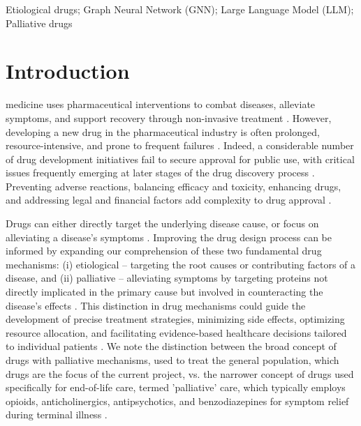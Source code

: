 \documentclass[journal,twoside,web]{ieeecolor}
\begin{document}
\begin{IEEEkeywords}
Etiological drugs;
Graph Neural Network (GNN);
Large Language Model (LLM);
Palliative drugs
\end{IEEEkeywords}

\section{Introduction}
\label{sec:intro}

 medicine uses pharmaceutical interventions to combat diseases, alleviate symptoms, and support recovery through non-invasive treatment \cite{ravikumar2018improving,yu2020exploring}.
However, developing a new drug in the pharmaceutical industry is often prolonged, resource-intensive, and prone to frequent failures \cite{hammel2019new,xue2018review}.
Indeed, a considerable number of drug development initiatives fail to secure approval for public use, with critical issues frequently emerging at later stages of the drug discovery process \cite{hammel2019new}.
Preventing adverse reactions, balancing efficacy and toxicity, enhancing drugs, and addressing legal and financial factors add complexity to drug approval \cite{ravikumar2018improving}.

Drugs can either directly target the underlying disease cause, or focus on alleviating a disease's symptoms \cite{yildirim2007drug,lindpaintner2002impact}.
Improving the drug design process can be informed by expanding our comprehension of these two fundamental drug mechanisms: 
(i) etiological -- targeting the root causes or contributing factors of a disease, and 
(ii) palliative -- alleviating symptoms by targeting proteins not directly implicated in the primary cause but involved in counteracting the disease's effects \cite{yildirim2007drug,lindpaintner2002impact}.
This distinction in drug mechanisms could guide the development of precise treatment strategies, minimizing side effects, optimizing resource allocation, and facilitating evidence-based healthcare decisions tailored to individual patients \cite{vogt2014molecularly}. We note the distinction between the broad concept of drugs with palliative mechanisms, used to treat the general population, which drugs are the focus of the current project, vs. the narrower concept of drugs used specifically for end-of-life care, termed 'palliative' care, which typically employs opioids, anticholinergics, antipsychotics, and benzodiazepines for symptom relief during terminal illness \cite{jansen2018safety}.
\end{document}
